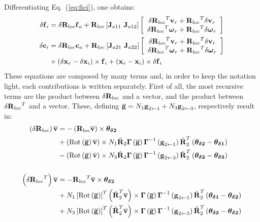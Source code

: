 Differentiating Eq.~(\ref{eq:fici}), one obtains:
\begin{align}
	\delta\bm{\mathbf{f}}_i &= \delta{\bm{\mathbf{R}}_{\text{loc}}} \bm{\mathbf{f}}_a 
		+ {\bm{\mathbf{R}}_{\text{loc}}} \left[ \bm{\mathbf{J}}_{a11}\ \bm{\mathbf{J}}_{a12} \right]
		\left[ \begin{array}{ c } 
		\delta{\bm{\mathbf{R}}_{\text{loc}}}^T\bm{\mathbf{v}}_r + {\bm{\mathbf{R}}_{\text{loc}}}^T\delta\bm{\mathbf{v}}_r\\
		\delta{\bm{\mathbf{R}}_{\text{loc}}}^T\bm{\mathbf{\omega}}_r + {\bm{\mathbf{R}}_{\text{loc}}}^T\delta\bm{\mathbf{\omega}}_r \end{array} \right]\\
\nonumber\delta\bm{\mathbf{c}}_i &= \delta{\bm{\mathbf{R}}_{\text{loc}}} \bm{\mathbf{c}}_a 
		+ {\bm{\mathbf{R}}_{\text{loc}}} \left[ \bm{\mathbf{J}}_{a21}\ \bm{\mathbf{J}}_{a22} \right]
		\left[ \begin{array}{ c } 
		\delta{\bm{\mathbf{R}}_{\text{loc}}}^T\bm{\mathbf{v}}_r + {\bm{\mathbf{R}}_{\text{loc}}}^T\delta\bm{\mathbf{v}}_r\\
		\delta{\bm{\mathbf{R}}_{\text{loc}}}^T\bm{\mathbf{\omega}}_r + {\bm{\mathbf{R}}_{\text{loc}}}^T\delta\bm{\mathbf{\omega}}_r \end{array} \right]\\
	&+ \left( \delta\bm{\mathbf{x}}_r - \delta\bm{\mathbf{x}}_i \right)\times\bm{\mathbf{f}}_i 
		+ \left( \bm{\mathbf{x}}_r - \bm{\mathbf{x}}_i \right)\times\delta\bm{\mathbf{f}}_i
\end{align}
These equations are composed by many terms and, in order to keep the
notation light, each contributions is written separately.
First of all, the most recursive terms are the product between 
$\delta{\bm{\mathbf{R}}_{\text{loc}}}$ and a vector, and the product between $\delta{\bm{\mathbf{R}}_{\text{loc}}}^T$
and a vector. These, defining $\overline{\bm{\mathbf{g}}}=N_1\bm{\mathbf{g}}_{2\leftarrow{1}} 
+ N_3\bm{\mathbf{g}}_{2\leftarrow{3}}$, 
respectively result in:
\newcommand{\vv}{\T{\overline{v}}}
\begin{align}
\nonumber	\plbr{\delta\Rloc}\vv &= 
		-\plbr{\Rloc\vv}\times\T{\theta_{\delta 2}}\\ 
\nonumber	&+\plbr{\Rot{\overline{\T{g}}}\vv}\times
		N_1\Rtilde{2}\T{\Gamma}\plbr{\overline{\T{g}}}
		\T{\Gamma}^{-1}\plbr{\T{g}_{2\leftarrow{1}}}\Rtilde{2}^T
		\plbr{\T{\theta_{\delta 2}}-\T{\theta_{\delta 1}}}\\ 
\nonumber	&-\plbr{\Rot{\overline{\T{g}}}\vv}\times
		N_3\Rtilde{2}\T{\Gamma}\plbr{\overline{\T{g}}}
		\T{\Gamma}^{-1}\plbr{\T{g}_{2\leftarrow{3}}}\Rtilde{2}^T
		\plbr{\T{\theta_{\delta 2}}-\T{\theta_{\delta 3}}}\\ 
		\\
\nonumber	\plbr{\delta\Rloc^T}\vv &= 
		-\Rloc^T\vv\times\T{\theta_{\delta 2}}\\ 
\nonumber	&+N_1\sqbr{\Rot{\overline{\T{g}}}}^T
			\plbr{\Rtilde{2}^T\vv}\times
		\T{\Gamma}\plbr{\overline{\T{g}}}
		\T{\Gamma}^{-1}\plbr{\T{g}_{2\leftarrow{1}}}\Rtilde{2}^T
		\plbr{\T{\theta_{\delta 1}}-\T{\theta_{\delta 2}}}\\ 
\nonumber	&+N_3\sqbr{\Rot{\overline{\T{g}}}}^T
			\plbr{\Rtilde{2}^T\vv}\times
		\T{\Gamma}\plbr{\overline{\T{g}}}
		\T{\Gamma}^{-1}\plbr{\T{g}_{2\leftarrow{3}}}\Rtilde{2}^T
		\plbr{\T{\theta_{\delta 3}}-\T{\theta_{\delta 2}}}\\ 
\end{align}
